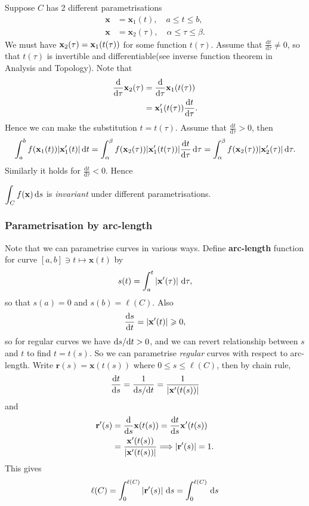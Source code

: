 Suppose $C$ has 2 different parametrisations
\begin{align*}
    \mathbf{x} &= \mathbf{x}_1(t), \quad a\le t\le b,\\
    \mathbf{x} &= \mathbf{x}_2(\tau),\quad \alpha\le \tau\le \beta.
\end{align*}
We must have $ {\bf x}_2(\tau) = {\bf x}_1(t(\tau)) $ for some function $t(\tau)$. Assume that $ \frac{\mathrm{d}t}{\mathrm{d}\tau}\neq 0  $, so that $ t(\tau) $ is invertible and differentiable(see inverse function theorem in Analysis and Topology). Note that 
\begin{align*}
    \frac{\mathrm{d}}{\mathrm{d}\tau} \mathbf{x}_2(\tau) &= \frac{\mathrm{d}}{\mathrm{d}\tau} \mathbf{x}_1(t(\tau))\\
    &= {\bf x}_1'(t(\tau)) \frac{\mathrm{d}t}{\mathrm{d}\tau}.  
\end{align*}
Hence we can make the substitution $ t=t(\tau) $. Assume that $ \frac{\mathrm{d}t}{\mathrm{d}\tau}>0  $, then 
\[
    \int_{a}^{b} f({\bf x}_1(t)) |\mathbf{x}_1'(t)| \,\mathrm{d}t = \int_{\alpha}^{\beta} f({\bf x}_2(\tau))|\mathbf{x}_1'(t(\tau))| \frac{\mathrm{d}t}{\mathrm{d}\tau}  \,\mathrm{d}\tau = \int_{\alpha}^{\beta} f({\bf x}_2(\tau))|\mathbf{x}_2'(\tau)| \,\mathrm{d}\tau.
\]
Similarly it holds for $ \frac{\mathrm{d}t}{\mathrm{d}\tau}<0  $. Hence
\begin{proposition}\label{prop:change of parametrisations}
    $ \displaystyle \int_{C} f({\bf x}) \,\mathrm{d}s $ is \textit{invariant} under different parametrisations.
\end{proposition}

\subsubsection{Parametrisation by arc-length}
Note that we can parametrise curves in various ways. Define \textbf{arc-length} function for curve $ [a,b]\ni t \mapsto \mathbf{x}(t) $ by 
\[
    s(t) = \int_{a}^{t} \left| {\bf x}'(\tau) \right| \,\mathrm{d}\tau,
\]
so that $s(a)=0$ and $ s(b)=\ell (C) $. Also 
\[
    \frac{\mathrm{d}s}{\mathrm{d}t} = \left| {\bf x}'(t) \right| \geqslant 0, 
\]
so for regular curves we have $ \mathrm{d} s/\mathrm{d} t >0 $, and we can revert relationship between $s$ and $t$ to find $t=t(s)$. So we can parametrise \textit{regular} curves with respect to arc-length. Write $ \mathbf{r}(s)=\mathbf{x}(t(s)) $ where $ 0\le s\le \ell (C) $, then by chain rule, 
\[
    \frac{\mathrm{d}t}{\mathrm{d}s} = \frac{1}{\mathrm{d} s/\mathrm{d} t} = \frac{1}{\left| \mathbf{x}'(t(s)) \right| }
\]
and 
\begin{align*}
    \mathbf{r}'(s)&= \frac{\mathrm{d}}{\mathrm{d}s}\mathbf{x}(t(s))=\frac{\mathrm{d}t}{\mathrm{d}s}\mathbf{x}'(t(s))\\ 
    &= \frac{\mathbf{x}'(t(s))}{\left| \mathbf{x}'(t(s)) \right|} \Longrightarrow \left| {\bf r}'(s) \right| =1. \\ 
\end{align*}
This gives 
\[
    \ell (C) = \int_{0}^{\ell (C)} \left| {\bf r}'(s) \right| \,\mathrm{d}s = \int_{0}^{\ell (C)} \,\mathrm{d}s
\]


